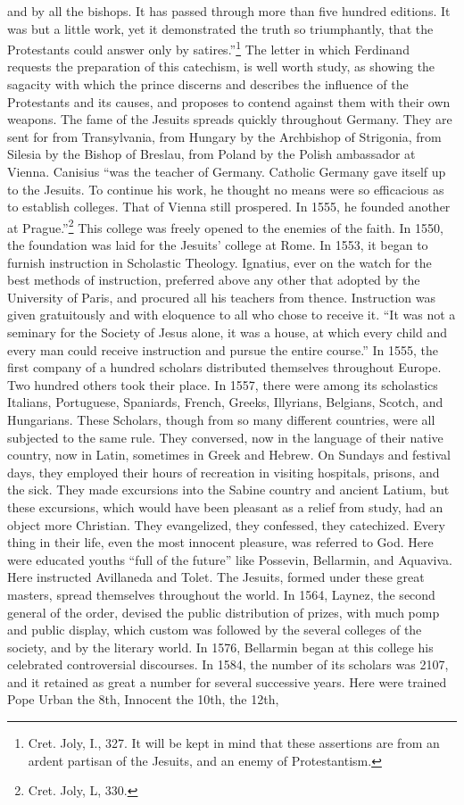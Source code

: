 \documentclass[]{book}
\let\rmarkdownfootnote\footnote%
\def\footnote{\protect\rmarkdownfootnote}
\begin{document}
and by all the bishops. It has passed through more than five hundred editions. It was but a little work, yet it demonstrated the truth so triumphantly, that the Protestants could answer only by satires.''\footnote{Cret. Joly, I., 327. It will be kept in mind that these assertions are from an ardent partisan of the Jesuits, and an enemy of Protestantism.} The letter in which Ferdinand requests the preparation of this catechism, is well worth study, as showing the sagacity with which the prince discerns and describes the influence of the Protestants and its causes, and proposes to contend against them with their own weapons. The fame of the Jesuits spreads quickly throughout Germany. They are sent for from Transylvania, from Hungary by the Archbishop of Strigonia, from Silesia by the Bishop of Breslau, from Poland by the Polish ambassador at Vienna. Canisius ``was the teacher of Germany. Catholic Germany gave itself up to the Jesuits. To continue his work, he thought no means were so efficacious as to establish colleges. That of Vienna still prospered. In 1555, he founded another at Prague.''\footnote{Cret. Joly, L, 330.} This college was freely opened to the enemies of the faith. In 1550, the foundation was laid for the Jesuits' college at Rome. In 1553, it began to furnish instruction in Scholastic Theology. Ignatius, ever on the watch for the best methods of instruction, preferred above any other that adopted by the University of Paris, and procured all his teachers from thence. Instruction was given gratuitously and with eloquence to all who chose to receive it. ``It was not a seminary for the Society of Jesus alone, it was a house, at which every child and every man could receive instruction and pursue the entire course.'' In 1555, the first company of a hundred scholars distributed themselves throughout Europe. Two hundred others took their place. In 1557, there were among its scholastics Italians, Portuguese, Spaniards, French, Greeks, Illyrians, Belgians, Scotch, and Hungarians. These Scholars, though from so many different countries, were all subjected to the same rule. They conversed, now in the language of their native country, now in Latin, sometimes in Greek and Hebrew. On Sundays and festival days, they employed their hours of recreation in visiting hospitals, prisons, and the sick. They made excursions into the Sabine country and ancient Latium, but these excursions, which would have been pleasant as a relief from study, had an object more Christian. They evangelized, they confessed, they catechized. Every thing in their life, even the most innocent pleasure, was referred to God. Here were educated youths ``full of the future'' like Possevin, Bellarmin, and Aquaviva. Here instructed Avillaneda and Tolet. The Jesuits, formed under these great masters, spread themselves throughout the world. In 1564, Laynez, the second general of the order, devised the public distribution of prizes, with much pomp and public display, which custom was followed by the several colleges of the society, and by the literary world. In 1576, Bellarmin began at this college his celebrated controversial discourses. In 1584, the number of its scholars was 2107, and it retained as great a number for several successive years. Here were trained Pope Urban the 8th, Innocent the 10th, the 12th, 
\end{document}
